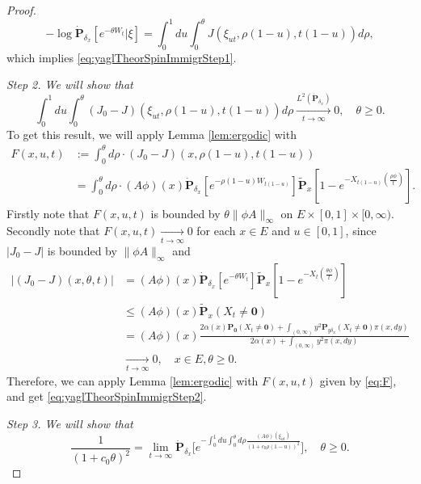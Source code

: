 \begin{proof}
\[
	-\log \dot{\mathbf P}_{\delta_x}[e^{-\theta W_t}|\xi]
	=\int_0^1 du\int_0^\theta J(\xi_{ut},\rho(1-u),t(1-u)) d\rho,
\]
	which implies \eqref{eq:yaglTheorSpinImmigrStep1}.
\par
	\emph{Step 2. We will show that}
\begin{equation}\label{eq:yaglTheorSpinImmigrStep2}
	\int_0^1 du\int_0^\theta (J_0-J)(\xi_{ut},\rho(1-u),t(1-u)) d\rho
	\xrightarrow[t\to\infty]{L^2(\dot{\mathbf P}_{\delta_x})} 0,\quad \theta\geq 0.
\end{equation}
	To get this result, we will apply Lemma \ref{lem:ergodic} with
\begin{equation}\label{eq:F}\begin{split}
	F(x,u,t)
	&:=\int_0^\theta d\rho\cdot (J_0-J)(x,\rho(1-u),t(1-u))\\
	&=\int_0^\theta d\rho\cdot  (A\phi)(x)\dot{\mathbf P}_{\delta_{x}}[e^{-\rho(1-u)W_{t(1-u)}}]\widetilde{\mathbf P}_{x}[1-e^{-X_{t(1-u)}(\frac{\rho\phi}{t})}].
\end{split}\end{equation}
	Firstly note that $F(x,u,t)$ is bounded by $\theta\|\phi A\|_\infty$ on $E\times[0,1]\times[0,\infty)$.
	Secondly note that $F(x,u,t)\xrightarrow[t\to\infty]{} 0$ for each $x\in E$ and $u\in[0,1]$, since $|J_0-J|$ is bounded by $\|\phi A\|_\infty$ and
\[\begin{split}
	\big|(J_0-J)(x,\theta,t)\big|
	&=  (A\phi)(x)\dot{\mathbf P}_{\delta_{x}}[e^{-\theta W_{t}}]\widetilde{\mathbf P}_{x}[1-e^{-X_t(\frac{\theta\phi}{t})}]\\
	&\leq  (A\phi)(x)\widetilde{\mathbf P}_{x}(X_t\neq \mathbf 0) \\
	&=  (A\phi)(x)\frac{2\alpha(x)\mathbf P_{\mathbf 0}(X_t\neq \mathbf 0)+\int_{(0,\infty)}y^2\mathbf P_{y\delta_x}(X_t\neq \mathbf 0)\pi(x,dy)}{2\alpha(x)+\int_{(0,\infty)}y^2\pi(x,dy)}\\
	&\xrightarrow[t\to\infty]{} 0, \quad x\in E,\theta\geq 0.
\end{split}\]
	Therefore, we can apply Lemma \ref{lem:ergodic} with $F(x,u,t)$ given by \eqref{eq:F}, and get \eqref{eq:yaglTheorSpinImmigrStep2}.
\par
	\emph{Step 3. We will show that}
\begin{equation}\label{eq:yaglTheorSpinImmigrStep3}
	\frac{1}{(1+c_0\theta)^2}
	= \lim_{t\to\infty} \dot {\mathbf P}_{\delta_x} \Big[e^{- \int_0^1 du \int_0^\theta d\rho \frac{ (A\phi)(\xi_{ut})}{(1+c_0\rho(1-u))^2} }\Big],
	\quad \theta\geq 0.
\end{equation}

\end{proof}
